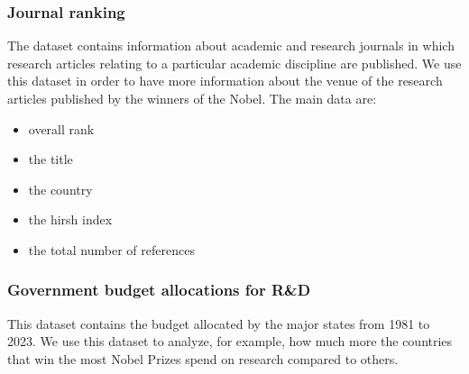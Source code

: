 \documentclass{article}
\begin{document}
\subsubsection*{Journal ranking}
The dataset contains information about academic and research journals in which research articles relating to a particular academic discipline are published.
We use this dataset in order to have more information about the venue of the research articles published by the winners of the Nobel. The main data are:
\begin{itemize}
	\item overall rank
	\item the title
	\item the country
	\item the hirsh index
	\item the total number of references
\end{itemize}
\subsubsection*{Government budget allocations for R\&D}
This dataset contains the budget allocated by the major states from 1981 to 2023. We use this dataset to analyze, for example,
how much more the countries that win the most Nobel Prizes spend on research compared to others.
\end{document}
